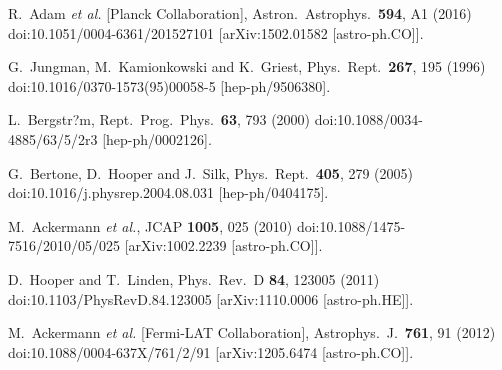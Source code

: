 \documentclass[12pt,prd,showpacs,amsmath,amssymb,aps,floats,floatfix,nofootinbib]{revtex4-1}
\begin{document}
\begin{thebibliography}{99}
  R.~Adam {\it et al.} [Planck Collaboration],
  Astron.\ Astrophys.\  {\bf 594}, A1 (2016)
  doi:10.1051/0004-6361/201527101
  [arXiv:1502.01582 [astro-ph.CO]].

  G.~Jungman, M.~Kamionkowski and K.~Griest,
  Phys.\ Rept.\  {\bf 267}, 195 (1996)
  doi:10.1016/0370-1573(95)00058-5
  [hep-ph/9506380].

  L.~Bergstr?m,
  Rept.\ Prog.\ Phys.\  {\bf 63}, 793 (2000)
  doi:10.1088/0034-4885/63/5/2r3
  [hep-ph/0002126].

  G.~Bertone, D.~Hooper and J.~Silk,
  Phys.\ Rept.\  {\bf 405}, 279 (2005)
  doi:10.1016/j.physrep.2004.08.031
  [hep-ph/0404175].

  M.~Ackermann {\it et al.},
  JCAP {\bf 1005}, 025 (2010)
  doi:10.1088/1475-7516/2010/05/025
  [arXiv:1002.2239 [astro-ph.CO]].

  D.~Hooper and T.~Linden,
  Phys.\ Rev.\ D {\bf 84}, 123005 (2011)
  doi:10.1103/PhysRevD.84.123005
  [arXiv:1110.0006 [astro-ph.HE]].

  M.~Ackermann {\it et al.} [Fermi-LAT Collaboration],
  Astrophys.\ J.\  {\bf 761}, 91 (2012)
  doi:10.1088/0004-637X/761/2/91
  [arXiv:1205.6474 [astro-ph.CO]].


\end{thebibliography}
\end{document}
